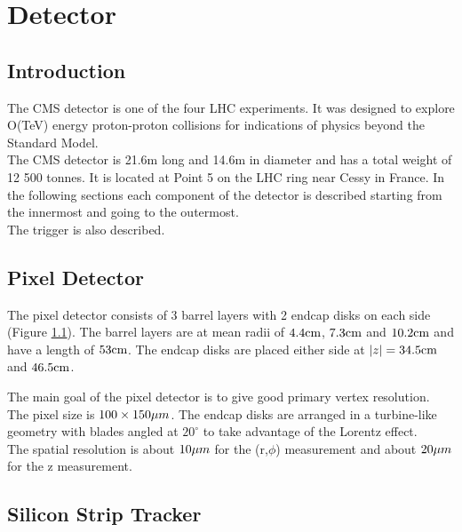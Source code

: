 \chapter{Detector}

\section{Introduction}

The CMS detector is one of the four LHC experiments. It was designed to explore 
O(TeV) energy proton-proton collisions for indications of physics beyond the 
Standard Model. \\

The CMS detector is 21.6m long and 14.6m in diameter and has a total weight of
12 500 tonnes. It is located at Point 5 on the LHC ring near Cessy in France. In
the following sections each component of the detector is described starting from
the innermost and going to the outermost. \\

The trigger is also described.

\section{Pixel Detector}

The pixel detector consists of 3 barrel layers with 2 endcap disks on each side
(Figure \ref{fig:Pixel}). The barrel layers are at mean radii of $4.4\mbox{cm}$,
$7.3\mbox{cm}$ and $10.2\mbox{cm}$ and have a length of $53\mbox{cm}$. The endcap disks are placed 
either side at $|z| = 34.5\mbox{cm}$ and $46.5\mbox{cm}$. \\

\begin{figure}
\label{fig:Pixel}
\end{figure}

The main goal of the pixel detector is to give good primary vertex resolution.
The pixel size is $100\times150\mu m$. The endcap disks are arranged in a 
turbine-like geometry with blades angled at $20^{\circ}$ to take advantage of 
the Lorentz effect. \\

The spatial resolution is about $10\mu m$ for the (r,$\phi$) measurement and 
about $20\mu m$ for the z measurement.

\section{Silicon Strip Tracker}

